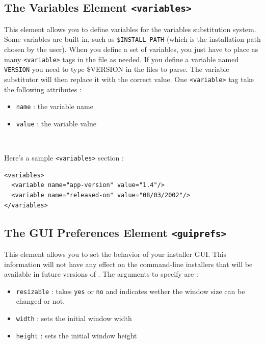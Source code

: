 \subsection{The Variables Element \texttt{<variables>}}

This element allows you to define variables for the variables
substitution system. Some variables are built-in, such as
\texttt{\$INSTALL\_PATH} (which is the installation path chosen by the
user). When you define a set of variables, you just have to place as
many \texttt{<variable>} tags in the file as needed. If you define a
variable named \texttt{VERSION} you need to type \$VERSION in the files
to parse. The variable substitutor will then replace it with the correct
value. One \texttt{<variable>} tag take the following attributes :
\begin{itemize}

  \item \texttt{name} : the variable name
  \item \texttt{value} : the variable value

\end{itemize}\

Here's a sample \texttt{<variables>} section :\\
\footnotesize
\begin{verbatim}
<variables>
  <variable name="app-version" value="1.4"/>
  <variable name="released-on" value="08/03/2002"/>
</variables>
\end{verbatim}
\normalsize

\subsection{The GUI Preferences Element \texttt{<guiprefs>}}

This element allows you to set the behavior of your installer GUI. This
information will not have any effect on the command-line installers that will be
available in future versions of \IzPack. The arguments to specify are :
\begin{itemize}

  \item \texttt{resizable} : takes \texttt{yes} or \texttt{no} and indicates
  wether the window size can be changed or not.
  \item \texttt{width} : sets the initial window width
  \item \texttt{height} : sets the initial window height
  
\end{itemize}\

